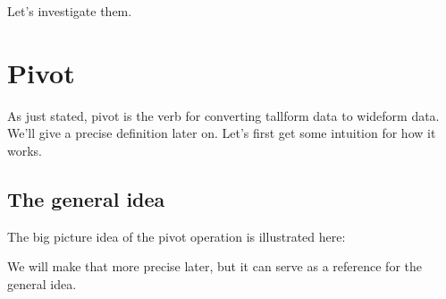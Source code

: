 \documentclass[letterpaper,10pt,english]{sphinxmanual}
\begin{document}
Let’s investigate them.


\section{Pivot}
\label{\detokenize{chapter-6-single-table-verbs:pivot}}
As just stated, pivot is the verb for converting tall\sphinxhyphen{}form data to wide\sphinxhyphen{}form data.  We’ll give a precise definition later on.  Let’s first get some intuition for how it works.


\subsection{The general idea}
\label{\detokenize{chapter-6-single-table-verbs:the-general-idea}}
The big picture idea of the pivot operation is illustrated here:



We will make that more precise later, but it can serve as a reference for the general idea.

 
\end{document}
